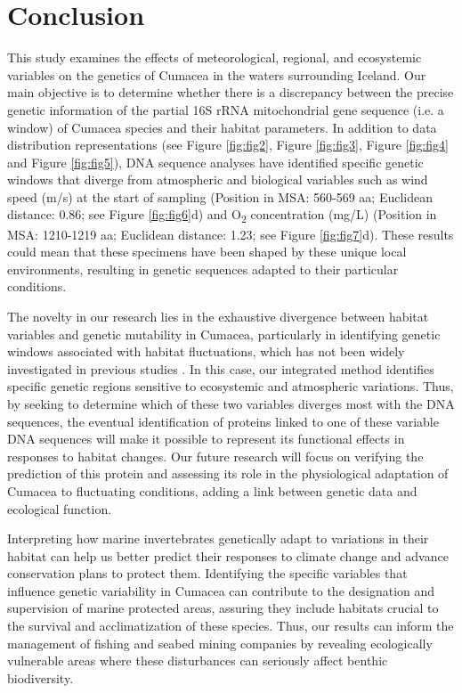 {\section{Conclusion}\label{conclusion}
This study examines the effects of meteorological, regional, and ecosystemic variables on the genetics of Cumacea in the waters surrounding Iceland. Our main objective is to determine whether there is a discrepancy between the precise genetic information of the partial 16S rRNA mitochondrial gene sequence (i.e. a window) of Cumacea species and their habitat parameters. In addition to data distribution representations (see Figure \ref{fig:fig2}, Figure \ref{fig:fig3}, Figure \ref{fig:fig4} and Figure \ref{fig:fig5}), DNA sequence analyses have identified specific genetic windows that diverge from atmospheric and biological variables such as wind speed (m/s) at the start of sampling (Position in MSA: 560-569 aa; Euclidean distance: 0.86; see Figure \ref{fig:fig6}d) and O\textsubscript{2} concentration (mg/L) (Position in MSA: 1210-1219 aa; Euclidean distance: 1.23; see Figure \ref{fig:fig7}d). These results could mean that these specimens have been shaped by these unique local environments, resulting in genetic sequences adapted to their particular conditions.

The novelty in our research lies in the exhaustive divergence between habitat variables and genetic mutability in Cumacea, particularly in identifying genetic windows associated with habitat fluctuations, which has not been widely investigated in previous studies \citep{manel2003landscape, vrijenhoek2009cryptic}. In this case, our integrated method identifies specific genetic regions sensitive to ecosystemic and atmospheric variations. Thus, by seeking to determine which of these two variables diverges most with the DNA sequences, the eventual identification of proteins linked to one of these variable DNA sequences will make it possible to represent its functional effects in responses to habitat changes. Our future research will focus on verifying the prediction of this protein and assessing its role in the physiological adaptation of Cumacea to fluctuating conditions, adding a link between genetic data and ecological function.

Interpreting how marine invertebrates genetically adapt to variations in their habitat can help us better predict their responses to climate change and advance conservation plans to protect them. Identifying the specific variables that influence genetic variability in Cumacea can contribute to the designation and supervision of marine protected areas, assuring they include habitats crucial to the survival and acclimatization of these species. Thus, our results can inform the management of fishing and seabed mining companies by revealing ecologically vulnerable areas where these disturbances can seriously affect benthic biodiversity.

}

